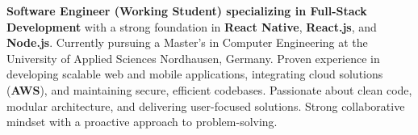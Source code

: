 \vspace{3pt}
\textbf{Software Engineer (Working Student) specializing in Full-Stack Development} with a strong foundation in \textbf{React Native}, \textbf{React.js}, and \textbf{Node.js}. Currently pursuing a Master's in Computer Engineering at the University of Applied Sciences Nordhausen, Germany. Proven experience in developing scalable web and mobile applications, integrating cloud solutions (\textbf{AWS}), and maintaining secure, efficient codebases. Passionate about clean code, modular architecture, and delivering user-focused solutions. Strong collaborative mindset with a proactive approach to problem-solving.

